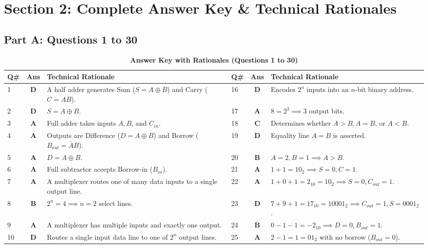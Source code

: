 \newpage
\section{Section 2: Complete Answer Key \& Technical Rationales}

\subsection*{Part A: Questions 1 to 30}
\begin{table}[htbp]
\centering
\caption{\textbf{Answer Key with Rationales (Questions 1 to 30)}}
\vspace{2mm}
\small
\begin{tabularx}{\textwidth}{l c X l c X}
\toprule
\textbf{Q\#} & \textbf{Ans} & \textbf{Technical Rationale} & \textbf{Q\#} & \textbf{Ans} & \textbf{Technical Rationale} \\
\midrule
1 & \textbf{D} & A half adder generates Sum ($S = A \oplus B$) and Carry ($C = AB$). & 16 & \textbf{D} & Encodes $2^n$ inputs into an $n$-bit binary address. \\
2 & \textbf{D} & $S = A \oplus B$. & 17 & \textbf{A} & $8 = 2^3 \implies 3$ output bits. \\
3 & \textbf{A} & Full adder takes inputs $A, B$, and $C_{in}$. & 18 & \textbf{C} & Determines whether $A > B, A = B$, or $A < B$. \\
4 & \textbf{A} & Outputs are Difference ($D = A \oplus B$) and Borrow ($B_{out} = \bar{A}B$). & 19 & \textbf{D} & Equality line $A = B$ is asserted. \\
5 & \textbf{A} & $D = A \oplus B$. & 20 & \textbf{B} & $A = 2, B = 1 \implies A > B$. \\
6 & \textbf{A} & Full subtractor accepts Borrow-in ($B_{in}$). & 21 & \textbf{A} & $1+1 = 10_2 \implies S=0, C=1$. \\
7 & \textbf{A} & A multiplexer routes one of many data inputs to a single output line. & 22 & \textbf{A} & $1+0+1 = 2_{10} = 10_2 \implies S=0, C_{out}=1$. \\
8 & \textbf{B} & $2^n = 4 \implies n = 2$ select lines. & 23 & \textbf{D} & $7 + 9 + 1 = 17_{10} = 10001_2 \implies C_{out}=1, S=0001_2$. \\
9 & \textbf{A} & A multiplexer has multiple inputs and exactly one output. & 24 & \textbf{B} & $0 - 1 - 1 = -2_{10} \implies D=0, B_{out}=1$. \\
10 & \textbf{D} & Routes a single input data line to one of $2^n$ output lines. & 25 & \textbf{A} & $2 - 1 = 1 = 01_2$ with no borrow ($B_{out}=0$). \\

\end{tabularx}
\end{table}
